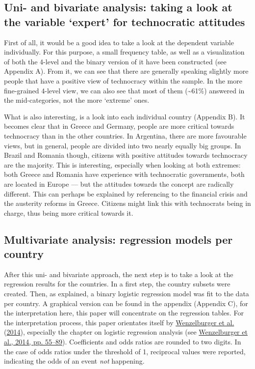\documentclass[
  12pt,
  english,
]{article}
\begin{document}
\hypertarget{uni--and-bivariate-analysis-taking-a-look-at-the-variable-expert-for-technocratic-attitudes}{%
\subsection{Uni- and bivariate analysis: taking a look at the variable
`expert' for technocratic
attitudes}\label{uni--and-bivariate-analysis-taking-a-look-at-the-variable-expert-for-technocratic-attitudes}}

First of all, it would be a good idea to take a look at the dependent
variable individually. For this purpose, a small frequency table, as
well as a visualization of both the 4-level and the binary version of it
have been constructed (see Appendix A). From it, we can see that there
are generally speaking slightly more people that have a positive view of
technocracy within the sample. In the more fine-grained 4-level view, we
can also see that most of them (\textasciitilde61\%) answered in the
mid-categories, not the more `extreme' ones.

What is also interesting, is a look into each individual country
(Appendix B). It becomes clear that in Greece and Germany, people are
more critical towards technocracy than in the other countries. In
Argentina, there are more favourable views, but in general, people are
divided into two nearly equally big groups. In Brazil and Romania
though, citizens with positive attitudes towards technocracy are the
majority. This is interesting, especially when looking at both extremes:
both Greece and Romania have experience with technocratic governments,
both are located in Europe --- but the attitudes towards the concept are
radically different. This can perhaps be explained by referencing to the
financial crisis and the austerity reforms in Greece. Citizens might
link this with technocrats being in charge, thus being more critical
towards it.

\hypertarget{multivariate-analysis-regression-models-per-country}{%
\subsection{Multivariate analysis: regression models per
country}\label{multivariate-analysis-regression-models-per-country}}

After this uni- and bivariate approach, the next step is to take a look
at the regression results for the countries. In a first step, the
country subsets were created. Then, as explained, a binary logistic
regression model was fit to the data per country. A graphical version
can be found in the appendix (Appendix C), for the interpretation here,
this paper will concentrate on the regression tables. For the
interpretation process, this paper orientates itself by
\protect\hyperlink{ref-wenzelburger2014statistische}{Wenzelburger et
al.} (\protect\hyperlink{ref-wenzelburger2014statistische}{2014}),
especially the chapter on logistic regression analysis (see
\protect\hyperlink{ref-wenzelburger2014statistische}{Wenzelburger et
al., 2014, pp. 55--89}). Coefficients and odds ratios are rounded to two
digits. In the case of odds ratios under the threshold of 1, reciprocal
values were reported, indicating the odds of an event \emph{not}
happening.
\end{document}
